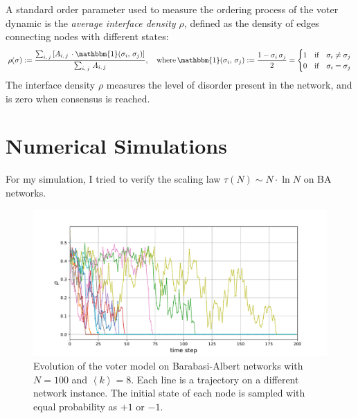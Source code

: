 A standard order parameter used to measure the ordering process of the voter dynamic is the \textit{average interface density $\rho$}, defined as the density of edges connecting nodes with different states:
\begin{equation}
    \rho(\mathbf{\sigma}) := \frac{\sum_{i,\,j}\left[A_{i,\,j}\,\cdot \mathbbm{1}(\sigma_i,\,\sigma_j)\right]}{\sum_{i,\,j}\, A_{i,\,j}}, \quad \text{where} \, \mathbbm{1}(\sigma_i,\,\sigma_j):= \frac{1 - \sigma_i\,\sigma_j}{2} = 
    \begin{cases}
        1 & \text{if}\quad \sigma_i\neq \sigma_j \\
        0 & \text{if}\quad \sigma_i= \sigma_j \\
    \end{cases}
\label{eq:rho}
\end{equation}
The interface density $\rho$ measures the level of disorder present in the network, and is zero when consensus is reached. 
\section{Numerical Simulations}
For my simulation, I tried to verify the scaling law $\tau(N)\sim N\cdot\ln{N}$ on BA networks.
\begin{figure}[H]
    \centering
    \includegraphics[width=0.8\linewidth]{latex_source/images/voter/example_evolution.pdf}
    \caption{Evolution of the voter model on Barabasi-Albert networks with $N=100$ and $\left\langle k\right\rangle = 8$. Each line is a trajectory on a different network instance. The initial state of each node is sampled with equal probability as $+1$ or $-1$.}
    \label{fig:enter-label}
\end{figure}

